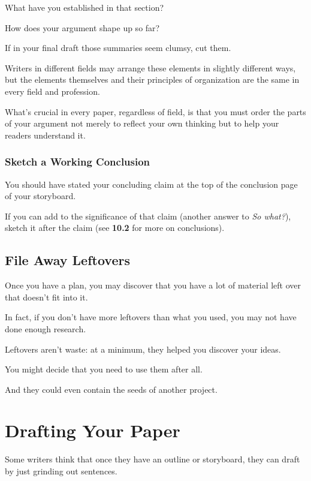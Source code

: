 \documentclass[oneside]{book}
\numberwithin{equation}{section}
\begin{document}
What have you established in that section?

How does your argument shape up so far?

If in your final draft those summaries seem clumsy, cut them.

%
Writers in different fields may arrange these elements in slightly different ways, but the elements themselves and their principles of organization are the same in every field and profession.

What's crucial in every paper, regardless of field, is that you must order the parts of your argument not merely to reflect your own thinking but to help your readers understand it.

\subsection{Sketch a Working Conclusion}
You should have stated your concluding claim at the top of the conclusion page of your storyboard.

If you can add to the significance of that claim (another answer to \textit{So what?}), sketch it after the claim (see \textbf{10.2} for more on conclusions).

\section{File Away Leftovers}
Once you have a plan, you may discover that you have a lot of material left over that doesn't fit into it.


In fact, if you don't have more leftovers than what you used, you may not have done enough research.

Leftovers aren't waste: at a minimum, they helped you discover your ideas.

You might decide that you need to use them after all.

And they could even contain the seeds of another project.


\chapter{Drafting Your Paper}

Some writers think that once they have an outline or storyboard, they can draft by just grinding out sentences.
\end{document}
